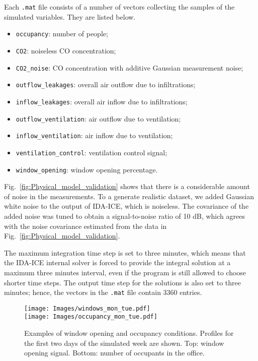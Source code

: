 \documentclass{article}
\begin{document}
Each \texttt{.mat} file consists of a number of vectors collecting the samples
of the simulated variables. They are listed below.
\begin{itemize}
\item \texttt{occupancy}: number of people;
\item \texttt{CO2}: noiseless CO concentration;
\item \texttt{CO2\_noise}: CO concentration with additive Gaussian measurement noise;
\item \texttt{outflow\_leakages}: overall air outflow due to infiltrations;
\item \texttt{inflow\_leakages}: overall air inflow due to infiltrations;
\item \texttt{outflow\_ventilation}: air outflow due to ventilation;
\item \texttt{inflow\_ventilation}: air inflow due to ventilation;
\item \texttt{ventilation\_control}: ventilation control signal;
\item \texttt{window\_opening}: window opening percentage.
\end{itemize}

Fig.~\ref{fig:Physical_model_validation} shows that there
is a considerable amount of noise in the measurements. To a generate realistic
dataset, we added Gaussian white noise to the output of IDA-ICE, which is
noiseless. The covariance of the added noise was tuned to obtain a
signal-to-noise ratio of 10 dB, which agrees with the noise covariance
estimated from the data in Fig.~\ref{fig:Physical_model_validation}.

The maximum integration time step is set to three minutes, which means that the
IDA-ICE internal solver is forced to provide the integral solution at a maximum
three minutes interval, even if the program is still allowed to choose shorter
time steps. The output time step for the solutions is also set to three minutes;
hence, the vectors in the \texttt{.mat} file contain 3360 entries.

\begin{figure}[htb]
\centering
\texttt{[image: Images/windows\_mon\_tue.pdf]}\\
\texttt{[image: Images/occupancy\_mon\_tue.pdf]}
  \caption{Examples of window opening and occupancy conditions. Profiles for the first two days of the simulated week are shown. Top: window
opening signal. Bottom:
number of occupants in the office.}\label{fig:occupancy_pattern}
\end{figure}
\end{document}

